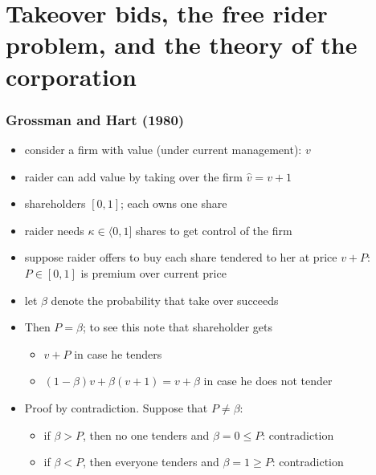 \documentclass[11pt,english]{beamer}
\begin{document}
\section{Takeover bids, the free rider problem, and the theory of the corporation}
\label{sec-5}
\begin{frame}[allowframebreaks]\frametitle{Grossman and Hart (1980)}
\label{sec-5-1}
\begin{itemize}

\item consider a firm with value (under current management): $v$\\
\label{sec-5-1-1}%
\item raider can add value by taking over the firm $\hat v = v+1$\\
\label{sec-5-1-2}%
\item shareholders $[0,1]$; each owns one share\\
\label{sec-5-1-3}%
\item raider needs $\kappa \in \langle 0,1]$ shares to get control of the firm\\
\label{sec-5-1-4}%
\item suppose raider offers to buy each share tendered to her at price $v+P$: $P \in [0,1]$ is premium over current price\\
\label{sec-5-1-5}%
\item let $\beta$ denote the probability that take over succeeds\\
\label{sec-5-1-6}%
\item Then $P=\beta$; to see this note that shareholder gets
\label{sec-5-1-7}%
\begin{itemize}

\item $v+P$ in case he tenders\\
\label{sec-5-1-7-1}%
\item $(1-\beta)v+\beta(v+1)=v+\beta$ in case he does not tender\\
\label{sec-5-1-7-2}%
\end{itemize} %

\item Proof by contradiction. Suppose that $P \neq \beta$:
\label{sec-5-1-8}%
\begin{itemize}

\item if $\beta>P$, then no one tenders and $\beta = 0 \leq P$: contradiction\\
\label{sec-5-1-8-1}%
\item if $\beta<P$, then everyone tenders and $\beta = 1 \geq P$: contradiction\\
\label{sec-5-1-8-2}%
\end{itemize} %


\end{itemize}
\end{frame}
\end{document}
